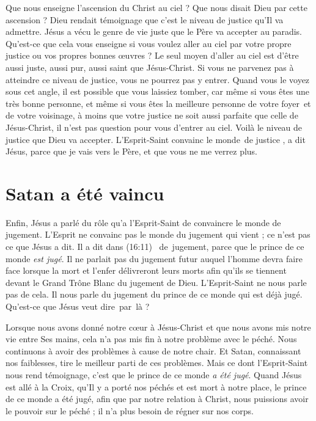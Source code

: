Que nous enseigne l'ascension du Christ au ciel ?
 Que nous disait Dieu par cette ascension ?
 Dieu rendait témoignage que c'est le niveau de justice qu'Il va admettre.
 Jésus a vécu le genre de vie juste que le Père va accepter au paradis.
 Qu'est-ce que cela vous enseigne si vous voulez aller au ciel par votre propre
 justice ou vos propres bonnes œuvres ?
 Le seul moyen d'aller au ciel est d'être aussi juste, aussi pur,
 aussi saint que Jésus-Christ.
 Si vous ne parvenez pas à atteindre ce niveau de justice,
 vous ne pourrez pas y entrer. Quand vous le voyez sous cet angle,
 il est possible que vous laissiez tomber, car même si vous êtes une très bonne
 personne, et même si vous êtes la meilleure personne de votre foyer~et %
 de votre voisinage, à moins que votre justice ne soit aussi parfaite
 que celle de Jésus-Christ, il n'est pas question pour vous d'entrer au ciel.
 Voilà le niveau de justice que Dieu va accepter.
 \Og L'Esprit-Saint convainc le monde~de justice \Fg{}, a dit Jésus,
 \Og parce que je vais vers le Père, et que vous ne me verrez plus. \Fg{}


\section{Satan a \'et\'e vaincu}

Enfin, Jésus a parlé du rôle qu'a l'Esprit-Saint de convaincre le monde de jugement.
 L'Esprit ne convainc pas le monde du jugement qui vient ;
 ce n'est pas ce que Jésus a dit. Il a dit dans (16:11)\frcolon{}
 \Og [...]~de~jugement, parce que le prince de ce monde \emph{est jugé}. \Fg{}
 Il ne parlait pas du jugement futur auquel l'homme devra faire face
 lorsque la mort et l'enfer délivreront leurs morts afin qu'ils se tiennent
 devant le Grand Trône Blanc du jugement de Dieu.
 L'Esprit-Saint ne nous parle pas de cela. Il nous parle du jugement
 du prince de ce monde qui est déjà jugé.
 Qu'est-ce que Jésus veut dire~par~là ?

Lorsque nous avons donné notre cœur à Jésus-Christ et que nous avons mis notre vie
 entre Ses mains, cela n'a pas mis fin à notre problème avec le péché.
 Nous continuons à avoir des problèmes à cause de notre chair.
 Et Satan, connaissant nos faiblesses,
 tire le meilleur parti de ces problèmes. Mais ce dont l'Esprit-Saint nous rend témoignage,
 c'est que le prince de ce monde \emph{a été jugé}.
 Quand Jésus est allé à la Croix, qu'Il y a porté nos péchés et est mort
 à notre place, le prince de ce monde a été jugé,
 afin que par notre relation à Christ, nous puissions avoir le pouvoir
 sur le péché ; il n'a plus besoin de régner sur nos corps.

